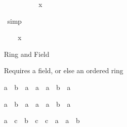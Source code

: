 \begin{isabellebody}
%
\begin{isamarkuptxt}%
\begin{isabelle}%
\ {}{\isachardot}\ {}\ {\isacharslash}\ {}\ {\isacharasterisk}\ {\isacharparenleft}{}\ {\isacharslash}\ {}{}{\isacharparenright}\ {\isacharless}\ x%
\end{isabelle}%
\end{isamarkuptxt}%
\isamarkuptrue%
\ simp\isamarkupfalse%
%
\begin{isamarkuptxt}%
\begin{isabelle}%
\ {}{\isachardot}\ {}\ {\isacharless}\ x\ {\isacharasterisk}\ {}%
\end{isabelle}%
\end{isamarkuptxt}%
\isamarkuptrue%
\isamarkupfalse%
%
\begin{isamarkuptext}%
Ring and Field

Requires a field, or else an ordered ring

\begin{isabelle}%
{\isacharparenleft}a\ {\isacharasterisk}\ b\ {\isacharequal}\ {\isacharparenleft}{}{\isasymColon}{\isacharprime}a{\isacharparenright}{\isacharparenright}\ {\isacharequal}\ {\isacharparenleft}a\ {\isacharequal}\ {\isacharparenleft}{}{\isasymColon}{\isacharprime}a{\isacharparenright}\ {\isasymor}\ b\ {\isacharequal}\ {\isacharparenleft}{}{\isasymColon}{\isacharprime}a{\isacharparenright}{\isacharparenright}%
\end{isabelle}

\begin{isabelle}%
{\isacharparenleft}a\ {\isacharasterisk}\ b\ {\isacharequal}\ {\isacharparenleft}{}{\isasymColon}{\isacharprime}a{\isacharparenright}{\isacharparenright}\ {\isacharequal}\ {\isacharparenleft}a\ {\isacharequal}\ {\isacharparenleft}{}{\isasymColon}{\isacharprime}a{\isacharparenright}\ {\isasymor}\ b\ {\isacharequal}\ {\isacharparenleft}{}{\isasymColon}{\isacharprime}a{\isacharparenright}{\isacharparenright}%
\end{isabelle}

\begin{isabelle}%
{\isacharparenleft}a\ {\isacharasterisk}\ c\ {\isacharequal}\ b\ {\isacharasterisk}\ c{\isacharparenright}\ {\isacharequal}\ {\isacharparenleft}c\ {\isacharequal}\ {\isacharparenleft}{}{\isasymColon}{\isacharprime}a{\isacharparenright}\ {\isasymor}\ a\ {\isacharequal}\ b{\isacharparenright}%
\end{isabelle}


\end{isamarkuptext}
\end{isabellebody}
